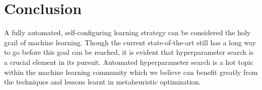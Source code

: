 \section{Conclusion}
A fully automated, self-configuring learning strategy can be considered the holy grail of machine learning. Though the current state-of-the-art still has a long way to go before this goal can be reached, it is evident that hyperparameter search is a crucial element in its pursuit. Automated hyperparameter search is a hot topic within the machine learning community which we believe can benefit greatly from the techniques and lessons learnt in metaheuristic optimization.






\cleardoublepage

